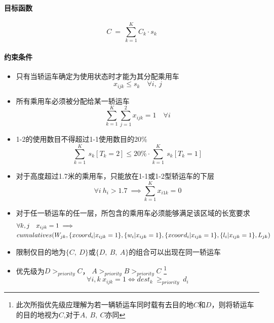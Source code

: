 \documentclass[UTF8]{ctexart}
\begin{document}
\paragraph{目标函数}
			\begin{equation}
				C \ = \ \sum_{k=1}^{K}C_k \cdot s_k
			\end{equation}
	
\paragraph{约束条件}
	\begin{itemize}
		\item 只有当轿运车确定为使用状态时才能为其分配乘用车
		\begin{equation}
		 x_{ijk} \leq s_k  \quad 	\forall i,~ j
		\end{equation}
		
		\item 所有乘用车必须被分配给某一轿运车
		\begin{equation}
			\sum_{k=1}^{K} \sum_{j=1}^{2} x_{ijk}=1 \quad \forall i
		\end{equation}
		
		\item 1-2的使用数目不得超过1-1使用数目的20\%
		\begin{equation}
			\sum_{k=1}^{K} \ s_k[T_k=2] \leq 20\% \cdot \sum_{k=1}^{K}  \ s_k[T_k=1]
		\end{equation}
		
		\item 对于高度超过1.7米的乘用车，只能放在1-1或1-2型轿运车的下层
		\begin{equation}
			\forall i \ h_i>1.7 \ \implies \sum_{k=1}^{K}x_{i1k}=0
		\end{equation}
		
		\item 对于任一轿运车的任一层，所包含的乘用车必须能够满足该区域的长宽要求
		\begin{align}
		&	\forall k, j \quad  x_{ijk}=1  \implies \notag\\
		&		 cumulatives(W_{jk}, \{xcoord_i | x_{ijk}=1 \},\{ w_i | x_{ijk}=1\},  \{xcoord_i | x_{ijk}=1 \}, \{l_i | x_{ijk}=1\}, L_{jk}) 
		\end{align}
		
		\item 限制仅目的地为$\{C,~D\}$或$\{D,~B,~A\}$的组合可以出现在同一轿运车
			
		
		\item 优先级为$D >_{priority} C$， $A >_{priority} B >_{priority} C $
			\footnote{此次所指优先级应理解为若一辆轿运车同时载有去目的地$C$和$D$，则将轿运车的目的地视为$C$,对于$A,~B,~C$亦同}
		\begin{equation}
			\forall i,k \  x_{ijk}=1 \Leftrightarrow 	dest_k \ \geq_{priority} \ d_i
		\end{equation}
		
	\end{itemize}
\end{document}
